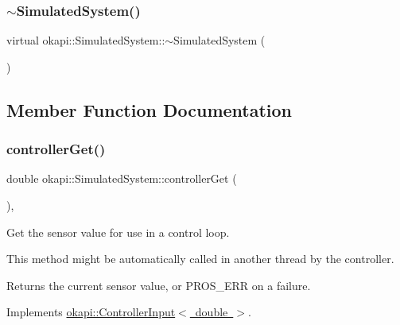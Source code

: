 \mbox{\label{classokapi_1_1SimulatedSystem_a8359c1f9e43efe92c93de1be557df0ed}} 
\subsubsection{\texorpdfstring{$\sim$SimulatedSystem()}{~SimulatedSystem()}}
{\footnotesize\ttfamily virtual okapi\+::\+Simulated\+System\+::$\sim$\+Simulated\+System (\begin{DoxyParamCaption}{ }\end{DoxyParamCaption})\hspace{0.3cm}{\ttfamily [virtual]}}



\subsection{Member Function Documentation}
\mbox{\label{classokapi_1_1SimulatedSystem_a877047f36bb429021097e620afccc316}} 
\subsubsection{\texorpdfstring{controllerGet()}{controllerGet()}}
{\footnotesize\ttfamily double okapi\+::\+Simulated\+System\+::controller\+Get (\begin{DoxyParamCaption}{ }\end{DoxyParamCaption})\hspace{0.3cm}{\ttfamily [override]}, {\ttfamily [virtual]}}



Get the sensor value for use in a control loop. 

This method might be automatically called in another thread by the controller.

\begin{DoxyReturn}{Returns}
the current sensor value, or {\ttfamily P\+R\+O\+S\+\_\+\+E\+RR} on a failure. 
\end{DoxyReturn}


Implements \mbox{\hyperlink{classokapi_1_1ControllerInput_a3c6c86d897983f367928a93890551e17}{okapi\+::\+Controller\+Input$<$ double $>$}}.

